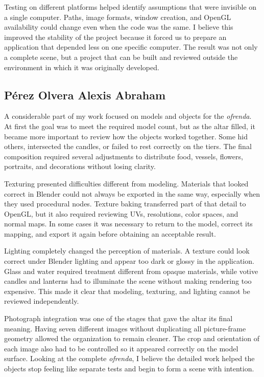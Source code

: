 \documentclass[letter,12pt]{article}
\begin{document}
	Testing on different platforms helped identify assumptions that were invisible on a single computer. Paths, image formats, window creation, and OpenGL availability could change even when the code was the same. I believe this improved the stability of the project because it forced us to prepare an application that depended less on one specific computer. The result was not only a complete scene, but a project that can be built and reviewed outside the environment in which it was originally developed.

	\subsection*{Pérez Olvera Alexis Abraham}
	A considerable part of my work focused on models and objects for the \textit{ofrenda}. At first the goal was to meet the required model count, but as the altar filled, it became more important to review how the objects worked together. Some hid others, intersected the candles, or failed to rest correctly on the tiers. The final composition required several adjustments to distribute food, vessels, flowers, portraits, and decorations without losing clarity.

	Texturing presented difficulties different from modeling. Materials that looked correct in Blender could not always be exported in the same way, especially when they used procedural nodes. Texture baking transferred part of that detail to OpenGL, but it also required reviewing UVs, resolutions, color spaces, and normal maps. In some cases it was necessary to return to the model, correct its mapping, and export it again before obtaining an acceptable result.

	Lighting completely changed the perception of materials. A texture could look correct under Blender lighting and appear too dark or glossy in the application. Glass and water required treatment different from opaque materials, while votive candles and lanterns had to illuminate the scene without making rendering too expensive. This made it clear that modeling, texturing, and lighting cannot be reviewed independently.

	Photograph integration was one of the stages that gave the altar its final meaning. Having seven different images without duplicating all picture-frame geometry allowed the organization to remain cleaner. The crop and orientation of each image also had to be controlled so it appeared correctly on the model surface. Looking at the complete \textit{ofrenda}, I believe the detailed work helped the objects stop feeling like separate tests and begin to form a scene with intention.
\end{document}
